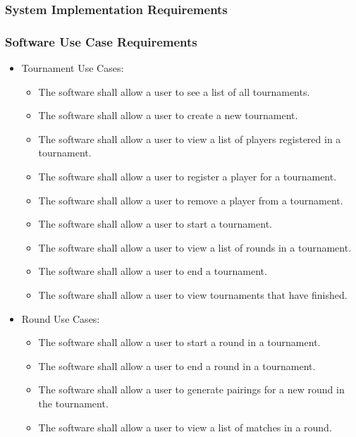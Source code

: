 \documentclass[11pt]{article}
\begin{document}
    \subsubsection{System Implementation Requirements}
    
    \subsubsection{Software Use Case Requirements}

    \begin{itemize}
        \item Tournament Use Cases:
        \begin{itemize}
            \item The software shall allow a user to see a list of all tournaments.
            \item The software shall allow a user to create a new tournament.
            \item The software shall allow a user to view a list of players registered in a tournament.
            \item The software shall allow a user to register a player for a tournament.
            \item The software shall allow a user to remove a player from a tournament.
            \item The software shall allow a user to start a tournament.
            \item The software shall allow a user to view a list of rounds in a tournament.
            \item The software shall allow a user to end a tournament.
            \item The software shall allow a user to view tournaments that have finished.
        \end{itemize}
        
        
        \item Round Use Cases:
        \begin{itemize}
            \item The software shall allow a user to start a round in a tournament.
            \item The software shall allow a user to end a round in a tournament.
            \item The software shall allow a user to generate pairings for a new round in the tournament.
            \item The software shall allow a user to view a list of matches in a round.
        \end{itemize}
        

\end{itemize}
\end{document}

